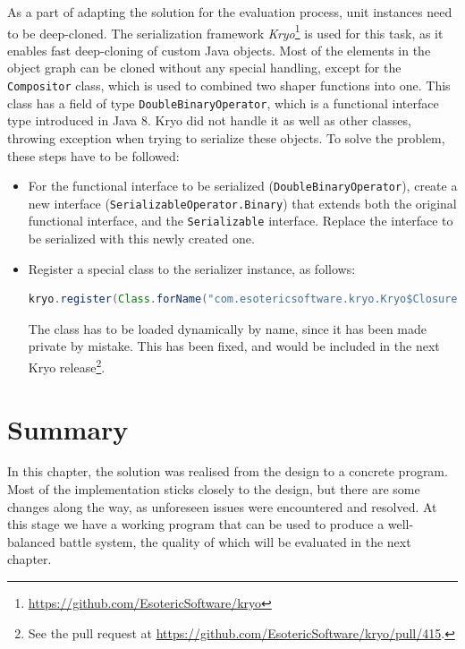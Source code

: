 As a part of adapting the solution for the evaluation process, unit instances need to be deep-cloned. The serialization framework \textit{Kryo}\footnote{\url{https://github.com/EsotericSoftware/kryo}} is used for this task, as it enables fast deep-cloning of custom Java objects. Most of the elements in the object graph can be cloned without any special handling, except for the \texttt{Compositor} class, which is used to combined two shaper functions into one. This class has a field of type \texttt{DoubleBinaryOperator}, which is a functional interface type introduced in Java 8. Kryo did not handle it as well as other classes, throwing exception when trying to serialize these objects. To solve the problem, these steps have to be followed:
\begin{itemize}
	\item For the functional interface to be serialized (\texttt{DoubleBinaryOperator}), create a new interface (\texttt{SerializableOperator.Binary}) that extends both the original functional interface, and the \texttt{Serializable} interface. Replace the interface to be serialized with this newly created one.
	\item Register a special class to the serializer instance, as follows:
	\begin{lstlisting}[language=Java]
kryo.register(Class.forName("com.esotericsoftware.kryo.Kryo$Closure"), new com.esotericsoftware.kryo.serializers.ClosureSerializer());
	\end{lstlisting}
	The class has to be loaded dynamically by name, since it has been made private by mistake. This has been fixed, and would be included in the next Kryo release\footnote{See the pull request at \url{https://github.com/EsotericSoftware/kryo/pull/415}.}.
\end{itemize}

\section{Summary}

In this chapter, the solution was realised from the design to a concrete program. Most of the implementation sticks closely to the design, but there are some changes along the way, as unforeseen issues were encountered and resolved. At this stage we have a working program that can be used to produce a well-balanced battle system, the quality of which will be evaluated in the next chapter.